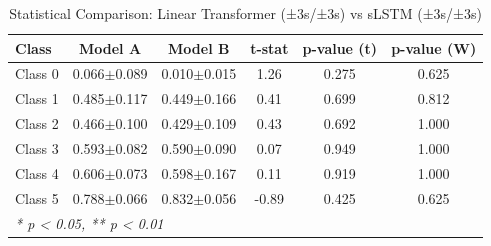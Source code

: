 \begin{table}[htbp]
\centering
\caption{Statistical Comparison: Linear Transformer (±3s/±3s) vs sLSTM (±3s/±3s)}
\label{tab:comparison_class_linear_transformer_±3s_±3s_vs_slstm_±3s_±3s}
\begin{tabular}{lccccc}
\toprule
\textbf{Class} & \textbf{Model A} & \textbf{Model B} & \textbf{t-stat} & \textbf{p-value (t)} & \textbf{p-value (W)} \\
\midrule
Class 0 & 0.066$\pm$0.089 & 0.010$\pm$0.015 & 1.26 & 0.275 & 0.625 \\
Class 1 & 0.485$\pm$0.117 & 0.449$\pm$0.166 & 0.41 & 0.699 & 0.812 \\
Class 2 & 0.466$\pm$0.100 & 0.429$\pm$0.109 & 0.43 & 0.692 & 1.000 \\
Class 3 & 0.593$\pm$0.082 & 0.590$\pm$0.090 & 0.07 & 0.949 & 1.000 \\
Class 4 & 0.606$\pm$0.073 & 0.598$\pm$0.167 & 0.11 & 0.919 & 1.000 \\
Class 5 & 0.788$\pm$0.066 & 0.832$\pm$0.056 & -0.89 & 0.425 & 0.625 \\
\bottomrule
\multicolumn{6}{l}{\textit{* p < 0.05, ** p < 0.01}} \\
\end{tabular}
\end{table}